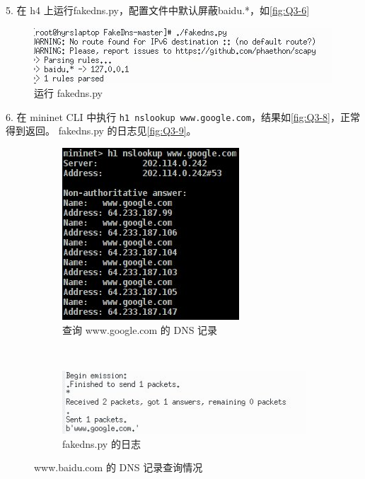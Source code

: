 \documentclass[format=draft,language=chinese,category=SDN]{hustreport}
\newcommand{\code}{\texttt}
\begin{document}
5. 在 h4 上运行fakedns.py，配置文件中默认屏蔽baidu.*，如\autoref{fig:Q3-6}
\begin{figure}[!h]
\centering
\includegraphics[width=.618\textwidth]{fig/3_6}
\caption{运行 fakedns.py}\label{fig:Q3-6}
\end{figure}

6. 在 mininet CLI 中执行 \code{h1 nslookup www.google.com}，结果如\autoref{fig:Q3-8}，正常得到返回。
fakedns.py 的日志见\autoref{fig:Q3-9}。
\begin{figure}[!h]
\centering
  \begin{subfigure}[b]{0.48\textwidth}
  \includegraphics[width=\textwidth]{fig/3_8}
  \caption{查询 www.google.com 的 DNS 记录}\label{fig:Q3-8}
  \end{subfigure}
  ~
  \begin{subfigure}[b]{0.48\textwidth}
  \includegraphics[width=\textwidth]{fig/3_9}
  \caption{fakedns.py 的日志}\label{fig:Q3-9}
  \end{subfigure}
\caption{www.baidu.com 的 DNS 记录查询情况}\label{fig:Q3-S2}
\end{figure}
\end{document}
